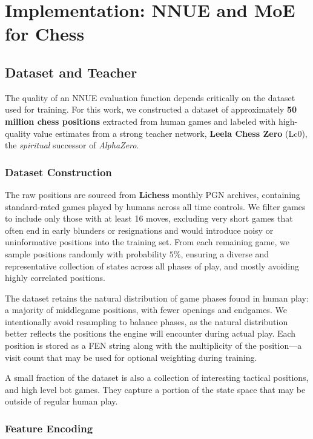 \chapter{Implementation: NNUE and MoE for Chess}\label{ch:implementation}

\section{Dataset and Teacher}\label{sec:dataset}

The quality of an NNUE evaluation function depends critically on the dataset used for training. For this work, we constructed a dataset of approximately \textbf{50 million chess positions} extracted from human games and labeled with high-quality value estimates from a strong teacher network, \textbf{Leela Chess Zero} (Lc0), the \emph{spiritual} successor of \emph{AlphaZero}.

\subsection{Dataset Construction}\label{sec:dataset-construction}

The raw positions are sourced from \textbf{Lichess} monthly PGN archives, containing standard-rated games played by humans across all time controls. We filter games to include only those with at least 16 moves, excluding very short games that often end in early blunders or resignations and would introduce noisy or uninformative positions into the training set. From each remaining game, we sample positions randomly with probability \(5\%\), ensuring a diverse and representative collection of states across all phases of play, and mostly avoiding highly correlated positions.

The dataset retains the natural distribution of game phases found in human play: a majority of middlegame positions, with fewer openings and endgames. We intentionally avoid resampling to balance phases, as the natural distribution better reflects the positions the engine will encounter during actual play. Each position is stored as a FEN string along with the multiplicity of the position---a visit count that may be used for optional weighting during training.

A small fraction of the dataset is also a collection of interesting tactical positions, and high level bot games. They capture a portion of the state space that may be outside of regular human play.

\subsection{Feature Encoding}\label{sec:feature-encoding}

